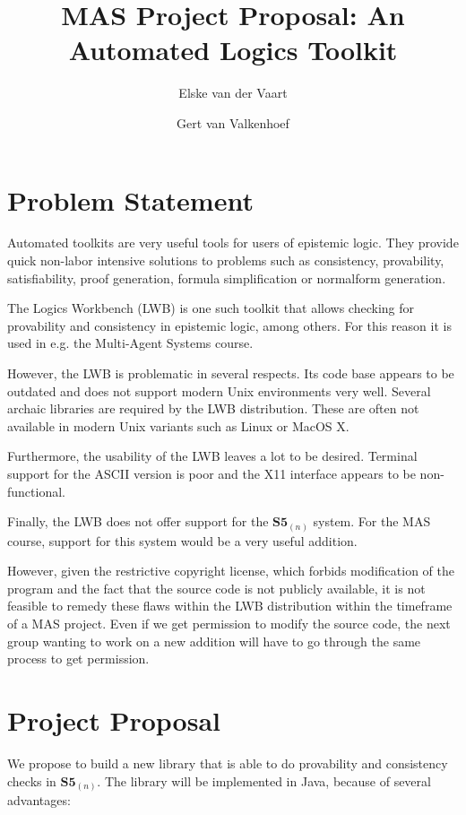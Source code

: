 \documentclass[11pt,a4paper]{article}
\author{Elske van der Vaart \and Gert van Valkenhoef}
\title{MAS Project Proposal: An Automated Logics Toolkit}
\begin{document}
\maketitle

\section*{Problem Statement}

Automated toolkits are very useful tools for users of epistemic logic. They
provide quick non-labor intensive solutions to problems such as consistency,
provability, satisfiability, proof generation, formula simplification or
normalform generation.

The Logics Workbench (LWB) is one such toolkit that allows checking for
provability and consistency in epistemic logic, among others. For this reason
it is used in e.g.  the Multi-Agent Systems course.

However, the LWB is problematic in several respects. Its code base appears to
be outdated and does not support modern Unix environments very well. Several
archaic libraries are required by the LWB distribution. These are often not
available in modern Unix variants such as Linux or MacOS X. 

Furthermore, the usability of the LWB leaves a lot to be desired. Terminal
support for the ASCII version is poor and the X11 interface appears to be
non-functional.

Finally, the LWB does not offer support for the $\textbf{S5}_{(n)}$ system.
For the MAS course, support for this system would be a very useful addition.

However, given the restrictive copyright license, which forbids modification
of the program and the fact that the source code is not publicly available, it
is not feasible to remedy these flaws within the LWB distribution within the
timeframe of a MAS project. Even if we get permission to modify the source
code, the next group wanting to work on a new addition will have to go
through the same process to get permission.

\section*{Project Proposal}

We propose to build a new library that is able to do provability and
consistency checks in $\textbf{S5}_{(n)}$. The library will be implemented in
Java, because of several advantages:
\end{document}
